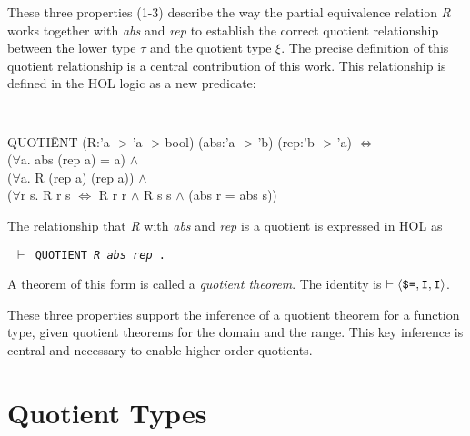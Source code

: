\documentclass[envcountsame,runningheads]{llncs}
\newcommand{\quotient}{partial equivalence}
\begin{document}
These three properties (1-3) describe the way
the \quotient{} relation {\it R\/} works together with
{\it abs\/} and {\it rep}
to establish the correct
quotient relationship between the lower type $\tau$
and the quotient type $\xi$.
The precise definition of this quotient relationship
is a central contribution of this work.
This relationship is defined in the HOL logic as a new predicate:
{\tt
\begin{tabbing}
\hspace{3.5mm}
  QUOTI\=ENT  (R:'a -> 'a -> bool) (abs:'a -> 'b) (rep:'b -> 'a) $\Leftrightarrow$ \\
\>       ($\forall$a. abs (rep a) = a) $\wedge$ \\
\>       ($\forall$a. R (rep a) (rep a)) $\wedge$ \\
\>       ($\forall$r s. R r s $\Leftrightarrow$ R r r $\wedge$ R s s $\wedge$ (abs r = abs s))
\end{tabbing}}

\noindent
The relationship that {\it R\/} with {\it abs\/} and {\it rep\/}
is a quotient is
expressed in HOL as
\begin{center}
\tt
$\vdash$ QUOTIENT {\it R\/} {\it abs\/} {\it rep} .
\end{center}

\noindent
A theorem of this form is called a {\it quotient theorem}.
The identity is
$\vdash \langle \mbox{\tt \$=}, \mbox{\tt I}, \mbox{\tt I} \rangle$.

\begin{comment}
The traditional construction requires the elements of the
quotient
type to be subsets of the original type.
This definition of quotients only requires them to be isomorphic.
\end{comment}
%
These three properties support the inference of a quotient theorem for a
function type, given quotient theorems for the domain and the range.
This key inference is central and necessary to enable higher order quotients.


%
\section{Quotient Types}
%
\label{quotienttypes}
\end{document}
